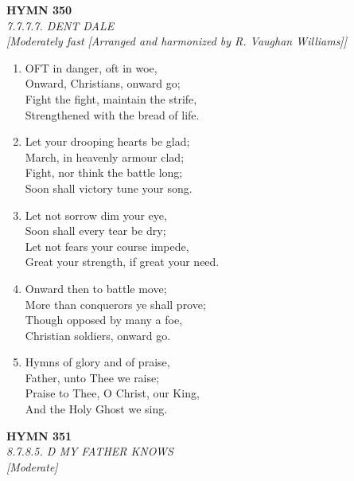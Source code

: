 \newpage
\begin{center}
    {\Large \textbf{HYMN 350}}
    \\
    \textit{7.7.7.7. DENT DALE}
    \\
    \textit{\small [Moderately fast [Arranged and harmonized by R. Vaughan Williams]]}
\end{center}
\vspace{1em}

\begin{enumerate}
    \item OFT in danger, oft in woe, \\
        Onward, Christians, onward go; \\
        Fight the fight, maintain the strife, \\
        Strengthened with the bread of life.

    \item Let your drooping hearts be glad; \\
        March, in heavenly armour clad; \\
        Fight, nor think the battle long; \\
        Soon shall victory tune your song.

    \item Let not sorrow dim your eye, \\
        Soon shall every tear be dry; \\
        Let not fears your course impede, \\
        Great your strength, if great your need.

    \item Onward then to battle move; \\
        More than conquerors ye shall prove; \\
        Though opposed by many a foe, \\
        Christian soldiers, onward go.

    \item Hymns of glory and of praise, \\
        Father, unto Thee we raise; \\
        Praise to Thee, O Christ, our King, \\
        And the Holy Ghost we sing.

\end{enumerate}

\newpage
\begin{center}
    {\Large \textbf{HYMN 351}}
    \\
    \textit{8.7.8.5. D MY FATHER KNOWS}
    \\
    \textit{\small [Moderate]}
\end{center}
\vspace{1em}

